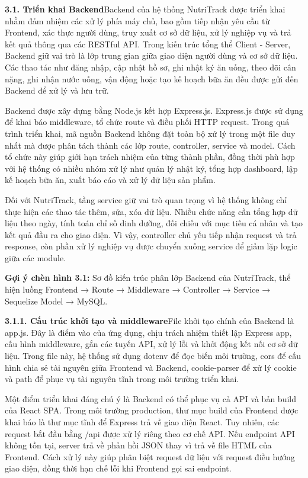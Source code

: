 \textbf{3.1. Triển khai Backend}Backend của hệ thống NutriTrack được triển khai nhằm đảm nhiệm các xử lý phía máy chủ, bao gồm tiếp nhận yêu cầu từ Frontend, xác thực người dùng, truy xuất cơ sở dữ liệu, xử lý nghiệp vụ và trả kết quả thông qua các RESTful API. Trong kiến trúc tổng thể Client - Server, Backend giữ vai trò là lớp trung gian giữa giao diện người dùng và cơ sở dữ liệu. Các thao tác như đăng nhập, cập nhật hồ sơ, ghi nhật ký ăn uống, theo dõi cân nặng, ghi nhận nước uống, vận động hoặc tạo kế hoạch bữa ăn đều được gửi đến Backend để xử lý và lưu trữ.

Backend được xây dựng bằng Node.js kết hợp Express.js. Express.js được sử dụng để khai báo middleware, tổ chức route và điều phối HTTP request. Trong quá trình triển khai, mã nguồn Backend không đặt toàn bộ xử lý trong một file duy nhất mà được phân tách thành các lớp route, controller, service và model. Cách tổ chức này giúp giới hạn trách nhiệm của từng thành phần, đồng thời phù hợp với hệ thống có nhiều nhóm xử lý như quản lý nhật ký, tổng hợp dashboard, lập kế hoạch bữa ăn, xuất báo cáo và xử lý dữ liệu sản phẩm.

Đối với NutriTrack, tầng service giữ vai trò quan trọng vì hệ thống không chỉ thực hiện các thao tác thêm, sửa, xóa dữ liệu. Nhiều chức năng cần tổng hợp dữ liệu theo ngày, tính toán chỉ số dinh dưỡng, đối chiếu với mục tiêu cá nhân và tạo kết quả đầu ra cho giao diện. Vì vậy, controller chủ yếu tiếp nhận request và trả response, còn phần xử lý nghiệp vụ được chuyển xuống service để giảm lặp logic giữa các module.

\textbf{Gợi ý chèn hình 3.1:} Sơ đồ kiến trúc phân lớp Backend của NutriTrack, thể hiện luồng Frontend → Route → Middleware → Controller → Service → Sequelize Model → MySQL.

\textbf{3.1.1. Cấu trúc khởi tạo và middleware}File khởi tạo chính của Backend là app.js. Đây là điểm vào của ứng dụng, chịu trách nhiệm thiết lập Express app, cấu hình middleware, gắn các tuyến API, xử lý lỗi và khởi động kết nối cơ sở dữ liệu. Trong file này, hệ thống sử dụng dotenv để đọc biến môi trường, cors để cấu hình chia sẻ tài nguyên giữa Frontend và Backend, cookie-parser để xử lý cookie và path để phục vụ tài nguyên tĩnh trong môi trường triển khai.

Một điểm triển khai đáng chú ý là Backend có thể phục vụ cả API và bản build của React SPA. Trong môi trường production, thư mục build của Frontend được khai báo là thư mục tĩnh để Express trả về giao diện React. Tuy nhiên, các request bắt đầu bằng /api được xử lý riêng theo cơ chế API. Nếu endpoint API không tồn tại, server trả về phản hồi JSON thay vì trả về file HTML của Frontend. Cách xử lý này giúp phân biệt request dữ liệu với request điều hướng giao diện, đồng thời hạn chế lỗi khi Frontend gọi sai endpoint.

